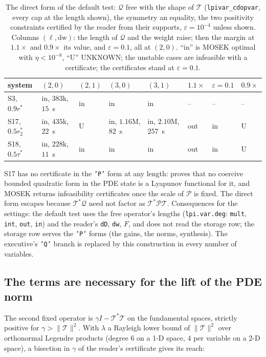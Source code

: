 \documentclass[12pt]{article}
\newcommand{\mcl}[1]{\mathcal{#1}}
\newcommand{\code}[1]{\texttt{#1}}
\newcommand{\file}[1]{\path{#1}}      %
\theoremstyle{plain}
\theoremstyle{definition}
\theoremstyle{remark}
\begin{document}
\begin{table}[h]\centering\scriptsize
\setlength{\tabcolsep}{3pt}
\begin{tabular}{llllllll}
\toprule
system & $(2,0)$ & $(2,1)$ & $(3,0)$ & $(3,1)$ & $1.1\times$ & $\varepsilon=0.1$ & $0.9\times$ \\
\midrule
S3, $0.9r^*$ & in, $383$k, $15$~s & in & in & in & -- & -- & -- \\
S17, $0.5r_2^*$ & in, $435$k, $22$~s & U & in, $1.16$M, $82$~s & in, $2.10$M, $257$~s & out & in & U \\
S18, $0.5\tau^*$ & in, $228$k, $11$~s & in & in & in & out & in & U \\
\bottomrule
\end{tabular}
\caption{The direct form of the default test: $\mcl Q$ free with the shape of $\mcl T$ (\code{lpivar\_cdopvar}, every cap at the length shown), the symmetry an equality, the two positivity constraints certified by the reader from their supports, $\varepsilon=10^{-4}$ unless shown. Columns $(\ell,\mathrm{dw})$: the length of $\mcl Q$ and the weight raise; then the margin at $1.1\times$ and $0.9\times$ its value, and $\varepsilon=0.1$, all at $(2,0)$. ``in'' is MOSEK optimal with $\eta<10^{-8}$, ``U'' UNKNOWN; the unstable cases are infeasible with a certificate; the certificates stand at $\varepsilon=0.1$.}\label{tab:qdirect}
\end{table}

S17 has no certificate in the \code{'P'} form at any length: \file{mixed_domain/S17_obstruction.md} proves that no coercive bounded quadratic form in the PDE state is a Lyapunov functional for it, and MOSEK returns infeasibility certificates once the scale of $\mcl P$ is fixed. The direct form escapes because $\mcl T^*\mcl Q$ need not factor as $\mcl T^*\mcl P\mcl T$. Consequences for the settings: the default test uses the free operator's lengths (\code{lpi.var.deg}: \code{mult}, \code{int}, \code{out}, \code{in}) and the reader's \code{dD}, \code{dw}, $F$, and does not read the storage row; the storage row serves the \code{'P'} forms (the gains, the norms, synthesis). The executive's \code{'Q'} branch is replaced by this construction in every number of variables.

\subsection{The terms are necessary for the lift of the PDE norm}\label{sec:mixed-terms}

The second fixed operator is $\gamma I-\mcl T^*\mcl T$ on the fundamental spaces, strictly positive for $\gamma>\|\mcl T\|^2$. With $\lambda$ a Rayleigh lower bound of $\|\mcl T\|^2$ over orthonormal Legendre products (degree $6$ on a 1-D space, $4$ per variable on a 2-D space), a bisection in $\gamma$ of the reader's certificate gives its reach:
\end{document}
